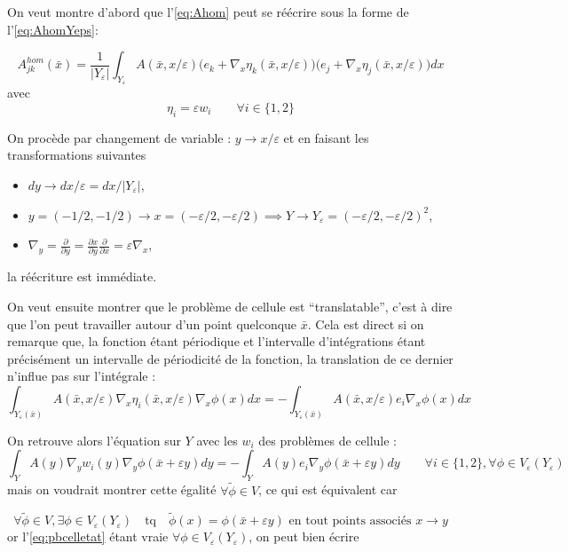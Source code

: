 \documentclass[11pt]{article}
\newcommand{\Ah}{A^{hom}}
\newcommand{\bx}{\bar{x}}
\newcommand{\tphi}{\tilde{\phi}}
\newcommand{\Ye}{Y_\varepsilon}
\begin{document}
On veut montre d'abord que l'\autoref{eq:Ahom} peut se réécrire sous la forme de l'\autoref{eq:AhomYeps}:

\begin{equation}
  \label{eq:AhomYeps}
  \Ah_{jk}(\bx) = \frac{1}{|\Ye|}
  \int_{\Ye} A(\bx, x/\varepsilon) \big(e_k+\nabla_x \eta_k(\bx, x/\varepsilon)\big)\big(e_j+\nabla_x \eta_j(\bx, x/\varepsilon)\big) dx
\end{equation}
avec 
\[
  \eta_i = \varepsilon w_i \qquad \forall i \in \{1,2\}
\]

On procède par changement de variable : $ y \rightarrow x/\varepsilon $ et en faisant les transformations suivantes
\begin{itemize}
\item $dy \rightarrow dx/\varepsilon = dx/|\Ye|$,
\item $y=(-1/2, -1/2) \rightarrow x=(-\varepsilon/2, -\varepsilon/2) \implies Y \rightarrow \Ye = (-\varepsilon/2, -\varepsilon/2)^2$,
\item $\nabla_y = \frac{\partial}{\partial y} = \frac{\partial x}{\partial y}\frac{\partial}{\partial x} = \varepsilon \nabla_x $,
\end{itemize}
la réécriture est immédiate.

On veut ensuite montrer que le problème de cellule est ``translatable'', c'est à dire que l'on peut travailler autour d'un point quelconque
$\bx$. Cela est direct si on remarque que, la fonction étant périodique et l'intervalle d'intégrations étant précisément un intervalle de périodicité de la
fonction, la translation de ce dernier n'influe pas sur l'intégrale :
\begin{equation}
  \label{eq:pbcelletat}
  \int_{\Ye(\bx)} A(\bx, x/\varepsilon)\nabla_x \eta_i(\bx, x/\varepsilon) \nabla_x \phi(x) dx =
  - \int_{\Ye(\bx)} A(\bx, x/\varepsilon) e_i \nabla_x \phi(x) dx
\end{equation}

On retrouve alors l'équation sur $Y$ avec les $w_i$ des problèmes de cellule :
\[
    \int_{Y} A(y)\nabla_y w_i(y) \nabla_y \phi(\bx+\varepsilon y) dy =
  - \int_{Y} A(y) e_i \nabla_y \phi(\bx+\varepsilon y) dy \qquad \forall i \in \{1, 2\}, \forall \phi\in V_\varepsilon(\Ye)
\]
mais on voudrait montrer cette égalité $\forall \tphi \in V$, ce qui est équivalent car

\[
  \forall \tphi \in V, \exists \phi \in V_\varepsilon(\Ye) \quad \text{tq} \quad \tphi(x) =
  \phi(\bx+\varepsilon y) \text{ en tout points associés } x \rightarrow y
\]
or l'\autoref{eq:pbcelletat} étant vraie $\forall \phi \in V_\varepsilon(\Ye)$, on peut bien écrire 
\end{document}
